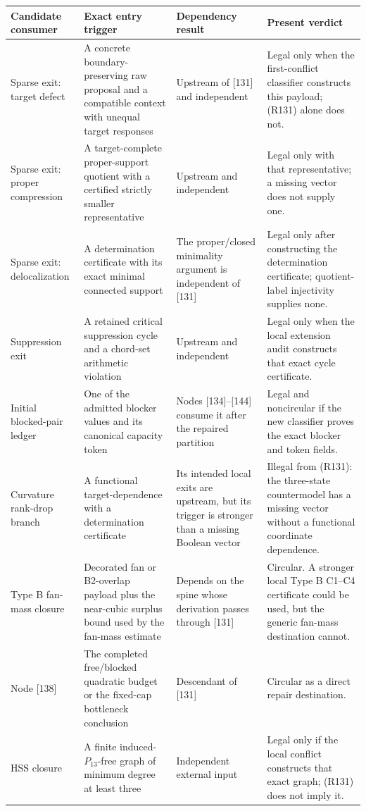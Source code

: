 \documentclass[11pt]{article}
\begin{document}
\begin{longtable}{>{\raggedright\arraybackslash}p{}
                  >{\raggedright\arraybackslash}p{}
                  >{\raggedright\arraybackslash}p{}
                  >{\raggedright\arraybackslash}p{}}
\toprule
Candidate consumer & Exact entry trigger & Dependency result & Present verdict \\
\midrule
Sparse exit: target defect & A concrete boundary-preserving raw proposal and
a compatible context with unequal target responses & Upstream of [131] and
independent & Legal only when the first-conflict classifier constructs this
payload; (R131) alone does not. \\
Sparse exit: proper compression & A target-complete proper-support quotient
with a certified strictly smaller representative & Upstream and independent &
Legal only with that representative; a missing vector does not supply one. \\
Sparse exit: delocalization & A determination certificate with its exact
minimal connected support & The proper/closed minimality argument is
independent of [131] & Legal only after constructing the determination
certificate; quotient-label injectivity supplies none. \\
Suppression exit & A retained critical suppression cycle and a chord-set
arithmetic violation & Upstream and independent & Legal only when the local
extension audit constructs that exact cycle certificate. \\
Initial blocked-pair ledger & One of the admitted blocker values and its
canonical capacity token & Nodes [134]--[144] consume it after the repaired
partition & Legal and noncircular if the new classifier proves the exact
blocker and token fields. \\
Curvature rank-drop branch & A functional target-dependence with a
determination certificate & Its intended local exits are upstream, but its
trigger is stronger than a missing Boolean vector & Illegal from (R131): the
three-state countermodel has a missing vector without a functional
coordinate dependence. \\
Type B fan-mass closure & Decorated fan or B2-overlap payload plus the
near-cubic surplus bound used by the fan-mass estimate & Depends on the spine
whose derivation passes through [131] & Circular.  A stronger local Type B
C1--C4 certificate could be used, but the generic fan-mass destination cannot. \\
Node [138] & The completed free/blocked quadratic budget or the fixed-cap
bottleneck conclusion & Descendant of [131] & Circular as a direct repair
destination. \\
HSS closure & A finite induced-$P_{13}$-free graph of minimum degree at least
three & Independent external input & Legal only if the local conflict
constructs that exact graph; (R131) does not imply it. \\
\bottomrule
\end{longtable}
\end{document}
